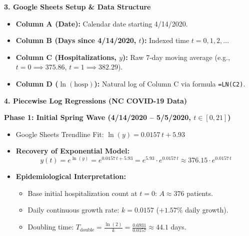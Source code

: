 \documentclass[10.5pt]{article}
\begin{document}
\vspace{0.02in}

\textbf{\large 3. Google Sheets Setup \& Data Structure}
\begin{itemize}[leftmargin=1.2em, topsep=1pt, itemsep=2pt]
  \item \textbf{Column A (Date):} Calendar date starting 4/14/2020.
  \item \textbf{Column B (Days since 4/14/2020, $t$):} Indexed time $t = 0, 1, 2, \dots$
  \item \textbf{Column C (Hospitalizations, $y$):} Raw 7-day moving average (e.g., $t=0 \implies 375.86$, $t=1 \implies 382.29$).
  \item \textbf{Column D ($\ln(\text{hosp})$):} Natural log of Column C via formula \texttt{=LN(C2)}.
\end{itemize}

\vspace{0.02in}

\textbf{\large 4. Piecewise Log Regressions (NC COVID-19 Data)}
\begin{tcolorbox}[colback=blue!3!white, colframe=chalkblue, boxrule=0.8pt, arc=3pt, left=8pt, right=8pt, top=4pt, bottom=4pt]
\textbf{Phase 1: Initial Spring Wave (4/14/2020 -- 5/5/2020, $t \in [0, 21]$)}
\begin{itemize}[leftmargin=1.2em, topsep=1pt, itemsep=2pt]
  \item Google Sheets Trendline Fit: \quad $\ln(y) = 0.0157\, t + 5.93$
  \item \textbf{Recovery of Exponential Model:}
  \[
    y(t) = e^{\ln(y)} = e^{0.0157\, t + 5.93} = e^{5.93} \cdot e^{0.0157\, t} \approx 376.15 \cdot e^{0.0157\, t}
  \]
  \item \textbf{Epidemiological Interpretation:}
  \begin{itemize}[label=$\circ$, leftmargin=1.2em]
    \item Base initial hospitalization count at $t=0$: $A \approx 376$ patients.
    \item Daily continuous growth rate: $k = 0.0157$ ($+1.57\%$ daily growth).
    \item Doubling time: $T_{\text{double}} = \frac{\ln(2)}{k} = \frac{0.6931}{0.0157} \approx 44.1$ days.
  \end{itemize}
\end{itemize}
\end{tcolorbox}

\vspace{0.02in}
\end{document}

